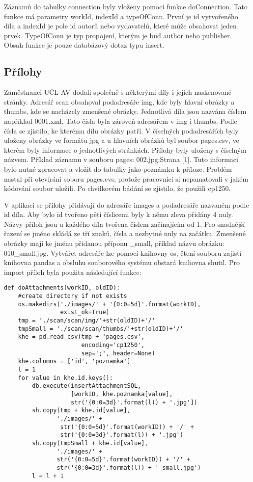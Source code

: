             Záznamů do tabulky connection byly vloženy pomocí funkce doConnection. Tato funkce má parametry workId, indexId a typeOfConn. První je id vytvořeného díla a indexId je pole id autorů nebo vydavatelů, které může obsahovat jeden prvek. TypeOfConn je typ propojení, kterým je buď author nebo publisher. Obsah funkce je pouze databázový dotaz typu insert.
            
        \subsection{Přílohy}
            Zaměstnanci UČL AV dodali společně s některými díly i jejich naskenované stránky. Adresář scan obsahoval  podadresáře img, kde byly hlavní obrázky a thumbs, kde se nacházely zmenšené obrázky. Jednotlivá díla jsou nazvána číslem například 0001.xml. Tato čísla byla zároveň adresářem v img i thumbs. Podle čísla se zjistilo, ke kterému dílu obrázky patří. V číselných podadresářích byly uloženy obrázky ve formátu jpg a u hlavních obrázků byl soubor pages.csv, ve kterém byly informace o jednotlivých stránkách. Přílohy byly uloženy s číselným názvem. Příklad záznamu v souboru pages: 002.jpg;Strana [1]. Tuto informaci bylo nutné zpracovat a vložit do tabulky jako poznámku k příloze. Problém nastal při otevírání soboru pages.cvs, protože pracovníci si nepamatovali v jakém kódování soubor uložili. Po chvilkovém bádání se zjistilo, že použili cp1250. 
            
            V aplikaci se přílohy přidávají do adresáře images a podadresáře nazvaném podle id díla. Aby bylo id tvořeno pěti číslicemi byly k němu zleva přidány 4 nuly. Názvy příloh jsou u každého díla tvořena číslem začínajícím od 1. Pro snadnější řazení se jméno skládá ze tří znaků, čísla a nezbytné nuly na začátku. Zmenšené obrázky mají ke jménu přidanou příponu \_small, příklad názvu obrázku: 010\_small.jpg. Vytvářet adresáře lze pomocí knihovny os, čtení souboru zajistí knihovna pandas a obsluhu souborového systému obstará knihovna shutil. Pro import příloh byla použita následující funkce:

\pagebreak
            \begin{verbatim}
def doAttachments(workID, oldID):
    #create directory if not exists
    os.makedirs('./images/' + '{0:0=5d}'.format(workID),
                exist_ok=True)
    tmp = './scan/scan/img/'+str(oldID)+'/'
    tmpSmall = './scan/scan/thumbs/'+str(oldID)+'/'
    khe = pd.read_csv(tmp + 'pages.csv',
                      encoding='cp1250',
                      sep=';', header=None)
    khe.columns = ['id', 'poznamka']
    l = 1
    for value in khe.id.keys():
        db.execute(insertAttachmentSQL,
                   [workID, khe.poznamka[value],
                   str('{0:0=3d}'.format(l)) + '.jpg'])
        sh.copy(tmp + khe.id[value], 
               './images/' + 
                str('{0:0=5d}'.format(workID)) + '/' +
                str('{0:0=3d}'.format(l)) + '.jpg')
        sh.copy(tmpSmall + khe.id[value], 
               './images/' + 
               str('{0:0=5d}'.format(workID)) + '/' +
               str('{0:0=3d}'.format(l)) + '_small.jpg')
        l = l + 1
            \end{verbatim}

